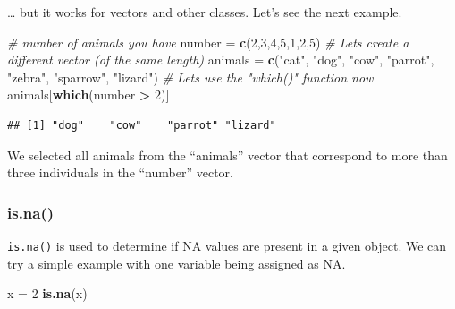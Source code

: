 \documentclass[
]{book}
\newenvironment{Shaded}{\begin{snugshade}}{\end{snugshade}}
\newcommand{\CommentTok}[1]{\textcolor[rgb]{0.56,0.35,0.01}{\textit{#1}}}
\newcommand{\DecValTok}[1]{\textcolor[rgb]{0.00,0.00,0.81}{#1}}
\newcommand{\FunctionTok}[1]{\textcolor[rgb]{0.13,0.29,0.53}{\textbf{#1}}}
\newcommand{\NormalTok}[1]{#1}
\newcommand{\OtherTok}[1]{\textcolor[rgb]{0.56,0.35,0.01}{#1}}
\newcommand{\SpecialCharTok}[1]{\textcolor[rgb]{0.81,0.36,0.00}{\textbf{#1}}}
\newcommand{\StringTok}[1]{\textcolor[rgb]{0.31,0.60,0.02}{#1}}
\begin{document}
\begin{Shaded}
\end{Shaded}

\ldots{} but it works for vectors and other classes. Let's see the next example.

\begin{Shaded}
\begin{Highlighting}[]
\CommentTok{\# number of animals you have}
\NormalTok{number }\OtherTok{=} \FunctionTok{c}\NormalTok{(}\DecValTok{2}\NormalTok{,}\DecValTok{3}\NormalTok{,}\DecValTok{4}\NormalTok{,}\DecValTok{5}\NormalTok{,}\DecValTok{1}\NormalTok{,}\DecValTok{2}\NormalTok{,}\DecValTok{5}\NormalTok{)}
\CommentTok{\# Let\textquotesingle{}s create a different vector (of the same length)}
\NormalTok{animals }\OtherTok{=} \FunctionTok{c}\NormalTok{(}\StringTok{"cat"}\NormalTok{, }\StringTok{"dog"}\NormalTok{, }\StringTok{"cow"}\NormalTok{, }\StringTok{"parrot"}\NormalTok{, }\StringTok{"zebra"}\NormalTok{, }\StringTok{"sparrow"}\NormalTok{, }\StringTok{"lizard"}\NormalTok{)}
\CommentTok{\# Let\textquotesingle{}s use the "which()" function now}
\NormalTok{animals[}\FunctionTok{which}\NormalTok{(number }\SpecialCharTok{\textgreater{}} \DecValTok{2}\NormalTok{)]}
\end{Highlighting}
\end{Shaded}

\begin{verbatim}
## [1] "dog"    "cow"    "parrot" "lizard"
\end{verbatim}

We selected all animals from the ``animals'' vector that correspond to more than three individuals in the ``number'' vector.

\hypertarget{is.na}{%
\subsubsection{is.na()}\label{is.na}}

\texttt{is.na()} is used to determine if NA values are present in a given object. We can try a simple example with one variable being assigned as NA.

\begin{Shaded}
\begin{Highlighting}[]
\NormalTok{x }\OtherTok{=} \DecValTok{2}
\FunctionTok{is.na}\NormalTok{(x)}
\end{Highlighting}
\end{Shaded}
\end{document}
